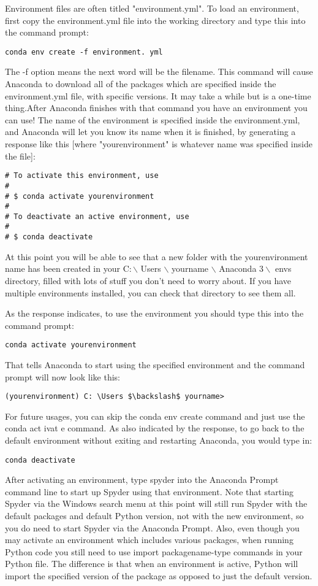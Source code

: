 Environment files are often titled "environment.yml". To load an environment, first copy the environment.yml file into the working directory and type this into the command prompt:
\begin{lstlisting}
conda env create -f environment. yml
\end{lstlisting}
The -f option means the next word will be the filename. This command will cause Anaconda to download all of the packages which are specified inside the environment.yml file, with specific versions. It may take a while but is a one-time thing.After Anaconda finishes with that command you have an environment you can use! The name of the environment is specified inside the environment.yml, and Anaconda will let you know its name when it is finished, by generating a response like this [where "yourenvironment" is whatever name was specified inside the file]:
\begin{lstlisting}
# To activate this environment, use
#
# $ conda activate yourenvironment
#
# To deactivate an active environment, use
#
# $ conda deactivate
\end{lstlisting}
At this point you will be able to see that a new folder with the yourenvironment name has been created in your $\mathrm{C}: \backslash$ Users $\backslash$ yourname $\backslash$ Anaconda $3 \backslash$ envs directory, filled with lots of stuff you don't need to worry about. If you have multiple environments installed, you can check that directory to see them all.

As the response indicates, to use the environment you should type this into the command prompt:
\begin{lstlisting}
conda activate yourenvironment
\end{lstlisting}
That tells Anaconda to start using the specified environment and the command prompt will now look like this:
\begin{lstlisting}
(yourenvironment) C: \Users $\backslash$ yourname>
\end{lstlisting}
For future usages, you can skip the conda env create command and just use the conda act ivat e command. As also indicated by the response, to go back to the default environment without exiting and restarting Anaconda, you would type in:
\begin{lstlisting}
conda deactivate
\end{lstlisting}
After activating an environment, type spyder into the Anaconda Prompt command line to start up Spyder using that environment. Note that starting Spyder via the Windows search menu at this point will still run Spyder with the default packages and default Python version, not with the new environment, so you do need to start Spyder via the Anaconda Prompt. Also, even though you may activate an environment which includes various packages, when running Python code you still need to use import packagename-type commands in your Python file. The difference is that when an environment is active, Python will import the specified version of the package as opposed to just the default version.\\

